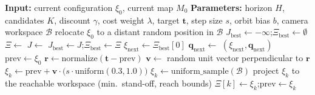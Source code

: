 
\begin{algorithm}[t]
\caption{Receding-Horizon Next-Best-View Planning}
\label{alg:rh-nbv}
\begin{algorithmic}[1]
\State \textbf{Input:} current configuration $\xi_0$, current map $M_0$
\State \textbf{Parameters:} horizon $H$, candidates $K$, discount $\gamma$,
       cost weight $\lambda$, target $\mathbf{t}$, step size $s$,
       orbit bias $b$, camera workspace $\mathcal{B}$
\Statex
{}
    \State relocate $\xi_0$ to a distant random position in $\mathcal{B}$
\EndIf
\State $J_{\mathrm{best}} \gets -\infty$;\quad $\Xi_{\mathrm{best}} \gets \emptyset$
    \State $\Xi \gets$ 
    \State $J \gets$ 
        \State $J_{\mathrm{best}} \gets J$;\quad $\Xi_{\mathrm{best}} \gets \Xi$
    \EndIf
\EndFor
\State $\xi_{\mathrm{next}} \gets \Xi_{\mathrm{best}}[0]$
\State $\mathbf{q}_{\mathrm{next}} \gets$ 
\State \Return $(\xi_{\mathrm{next}}, \mathbf{q}_{\mathrm{next}})$
\Statex
{}
    \State $\mathrm{prev} \gets \xi_0$
            \State $\mathbf{r} \gets \mathrm{normalize}(\mathbf{t} - \mathrm{prev})$
            \State $\mathbf{v} \gets$ random unit vector perpendicular to $\mathbf{r}$
            \State $\xi_k \gets \mathrm{prev} + \mathbf{v} \cdot
                   \bigl(s \cdot \mathrm{uniform}(0.3, 1.0)\bigr)$
        \Else
            \State $\xi_k \gets \mathrm{uniform\_sample}(\mathcal{B})$
        \EndIf
        \State project $\xi_k$ to the reachable workspace (min.\ stand-off, reach bounds)
        \State $\Xi[k] \gets \xi_k$;\quad $\mathrm{prev} \gets \xi_k$

\end{algorithmic}
\end{algorithm}
